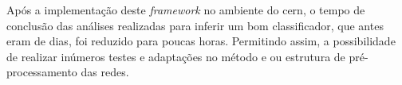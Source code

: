 Após a implementação deste \textit{framework} no ambiente do \acrshort{cern}, o tempo de conclusão das análises realizadas para inferir um bom classificador, que 
antes eram de dias, foi reduzido para poucas horas. Permitindo assim, a possibilidade de realizar inúmeros testes e adaptações no método e ou estrutura de
pré-processamento das redes.





